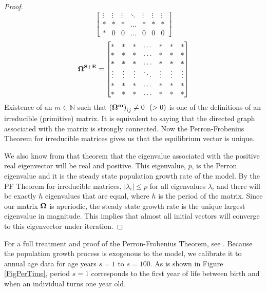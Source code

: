 \documentclass[letterpaper,12pt]{article}
\theoremstyle{definition}
\begin{document}
\begin{proof}
$$\begin{bmatrix}
    	\vdots & \vdots & \vdots & \ddots & \vdots & \vdots & \vdots \\
    	* & * & * & \hdots & * & * & * \\
    	* & 0 & 0 & \hdots & 0 & 0 & 0
    \end{bmatrix}
    $$
    $$\bf\Omega^{S+E} =
    \begin{bmatrix}
    	* & *  & * & \hdots & * & * & *\\
    	* & * & * & \hdots & * & * & * \\
    	* & * & * & \hdots & * & * & * \\
    	\vdots & \vdots & \vdots & \ddots & \vdots & \vdots & \vdots \\
    	* & * & * & \hdots & * & * & * \\
    	* & * & * & \hdots & * & * & *
    \end{bmatrix}
    $$
    Existence of an $m \in \mathbb N $ such that $\left(\bf\Omega^m\right)_{ij} \neq 0 ~~ ( > 0)$ is one of the definitions of an irreducible (primitive) matrix. It is equivalent to saying that the directed graph associated with the matrix is strongly connected.  Now the Perron-Frobenius Theorem for irreducible matrices gives us that the equilibrium vector is unique.

    We also know from that theorem that the eigenvalue associated with the positive real eigenvector will be real and positive.  This eigenvalue, $p$, is the Perron eigenvalue and it is the steady state population growth rate of the model.  By the PF Theorem for irreducible matrices, $| \lambda_i | \leq p$ for all eigenvalues $\lambda_i$ and there will be exactly $h$ eigenvalues that are equal, where $h$ is the period of the matrix.  Since our matrix $\bf\Omega$ is aperiodic, the steady state growth rate is the unique largest eigenvalue in magnitude.  This implies that almost all initial vectors will converge to this eigenvector under iteration.
  \end{proof}

  For a full treatment and proof of the Perron-Frobenius Theorem, see \citet{Suzumura:1983}. Because the population growth process is exogenous to the model, we calibrate it to annual age data for age years $s=1$ to $s=100$. As is shown in Figure \ref{FigPerTime}, period $s=1$ corresponds to the first year of life between birth and when an individual turns one year old.
\end{document}
